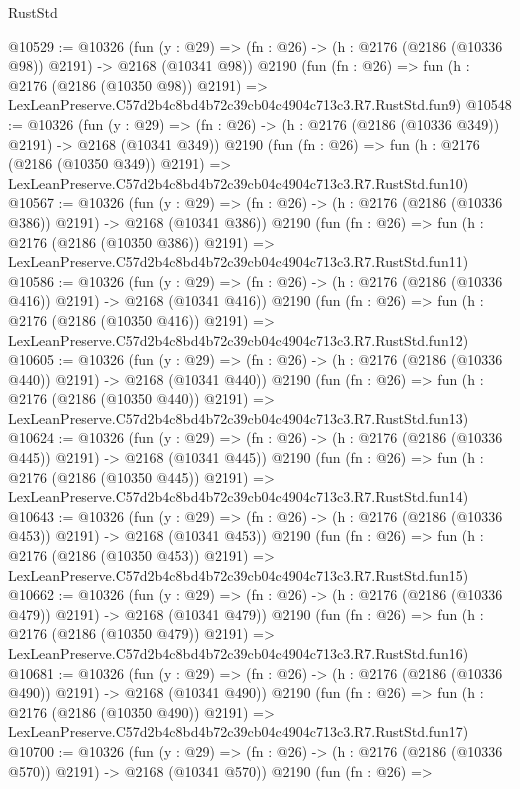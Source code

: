 \begin{lexlean}{RustStd}
\begin{coremodule}
@10529 := @10326
    (fun (y : @29) => (fn : @26) -> (h : @2176 (@2186 (@10336 @98)) @2191) -> @2168 (@10341 @98))
    @2190
    (fun (fn : @26) =>
    fun (h : @2176 (@2186 (@10350 @98)) @2191) =>
    LexLeanPreserve.C57d2b4c8bd4b72c39cb04c4904c713c3.R7.RustStd.fun9)
@10548 := @10326
    (fun (y : @29) => (fn : @26) -> (h : @2176 (@2186 (@10336 @349)) @2191) -> @2168 (@10341 @349))
    @2190
    (fun (fn : @26) =>
    fun (h : @2176 (@2186 (@10350 @349)) @2191) =>
    LexLeanPreserve.C57d2b4c8bd4b72c39cb04c4904c713c3.R7.RustStd.fun10)
@10567 := @10326
    (fun (y : @29) => (fn : @26) -> (h : @2176 (@2186 (@10336 @386)) @2191) -> @2168 (@10341 @386))
    @2190
    (fun (fn : @26) =>
    fun (h : @2176 (@2186 (@10350 @386)) @2191) =>
    LexLeanPreserve.C57d2b4c8bd4b72c39cb04c4904c713c3.R7.RustStd.fun11)
@10586 := @10326
    (fun (y : @29) => (fn : @26) -> (h : @2176 (@2186 (@10336 @416)) @2191) -> @2168 (@10341 @416))
    @2190
    (fun (fn : @26) =>
    fun (h : @2176 (@2186 (@10350 @416)) @2191) =>
    LexLeanPreserve.C57d2b4c8bd4b72c39cb04c4904c713c3.R7.RustStd.fun12)
@10605 := @10326
    (fun (y : @29) => (fn : @26) -> (h : @2176 (@2186 (@10336 @440)) @2191) -> @2168 (@10341 @440))
    @2190
    (fun (fn : @26) =>
    fun (h : @2176 (@2186 (@10350 @440)) @2191) =>
    LexLeanPreserve.C57d2b4c8bd4b72c39cb04c4904c713c3.R7.RustStd.fun13)
@10624 := @10326
    (fun (y : @29) => (fn : @26) -> (h : @2176 (@2186 (@10336 @445)) @2191) -> @2168 (@10341 @445))
    @2190
    (fun (fn : @26) =>
    fun (h : @2176 (@2186 (@10350 @445)) @2191) =>
    LexLeanPreserve.C57d2b4c8bd4b72c39cb04c4904c713c3.R7.RustStd.fun14)
@10643 := @10326
    (fun (y : @29) => (fn : @26) -> (h : @2176 (@2186 (@10336 @453)) @2191) -> @2168 (@10341 @453))
    @2190
    (fun (fn : @26) =>
    fun (h : @2176 (@2186 (@10350 @453)) @2191) =>
    LexLeanPreserve.C57d2b4c8bd4b72c39cb04c4904c713c3.R7.RustStd.fun15)
@10662 := @10326
    (fun (y : @29) => (fn : @26) -> (h : @2176 (@2186 (@10336 @479)) @2191) -> @2168 (@10341 @479))
    @2190
    (fun (fn : @26) =>
    fun (h : @2176 (@2186 (@10350 @479)) @2191) =>
    LexLeanPreserve.C57d2b4c8bd4b72c39cb04c4904c713c3.R7.RustStd.fun16)
@10681 := @10326
    (fun (y : @29) => (fn : @26) -> (h : @2176 (@2186 (@10336 @490)) @2191) -> @2168 (@10341 @490))
    @2190
    (fun (fn : @26) =>
    fun (h : @2176 (@2186 (@10350 @490)) @2191) =>
    LexLeanPreserve.C57d2b4c8bd4b72c39cb04c4904c713c3.R7.RustStd.fun17)
@10700 := @10326
    (fun (y : @29) => (fn : @26) -> (h : @2176 (@2186 (@10336 @570)) @2191) -> @2168 (@10341 @570))
    @2190
    (fun (fn : @26) =>

\end{coremodule}
\end{lexlean}
